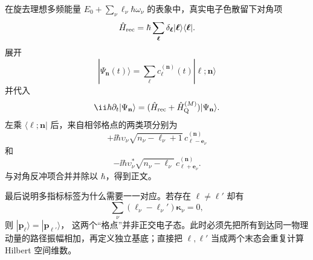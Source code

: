 \begin{derivation}
在旋去理想多频能量
$E_0+\sum_\nu\ell_\nu\hbar\omega_\nu$
的表象中，真实电子色散留下对角项
\[
\hat H_{\rm rec}
=
\hbar\sum_{\boldsymbol\ell}
\delta_{\boldsymbol\ell}
|\boldsymbol\ell\rangle\langle\boldsymbol\ell|.
\]
展开
\[
|\Psi_{\mathbf n}(t)\rangle
=
\sum_{\boldsymbol\ell}
c_{\boldsymbol\ell}^{(\mathbf n)}(t)
|\boldsymbol\ell;\mathbf n\rangle
\]
并代入
\[
\ii\hbar\partial_t|\Psi_{\mathbf n}\rangle
=
(\hat H_{\rm rec}+\hat H_{\rm Q}^{(M)})
|\Psi_{\mathbf n}\rangle.
\]
左乘 $\langle\boldsymbol\ell;\mathbf n|$ 后，来自相邻格点的两类项分别为
\[
+\ii\hbar
\upsilon_\nu
\sqrt{n_\nu-\ell_\nu+1}\,
c_{\boldsymbol\ell-\mathbf e_\nu}^{(\mathbf n)}
\]
和
\[
-\ii\hbar
\upsilon_\nu^*
\sqrt{n_\nu-\ell_\nu}\,
c_{\boldsymbol\ell+\mathbf e_\nu}^{(\mathbf n)}.
\]
与对角反冲项合并并除以 $\hbar$，得到正文。

最后说明多指标标签为什么需要一一对应。若存在
$\boldsymbol\ell\neq\boldsymbol\ell'$ 却有
\[
\sum_\nu
(\ell_\nu-\ell_\nu')
\boldsymbol\kappa_\nu=0,
\]
则
$|\mathbf p_{\boldsymbol\ell}\rangle=
|\mathbf p_{\boldsymbol\ell'}\rangle$，
这两个“格点”并非正交电子态。此时必须先把所有到达同一物理动量的路径振幅相加，再定义独立基底；直接把 $\boldsymbol\ell,\boldsymbol\ell'$ 当成两个末态会重复计算 Hilbert 空间维数。
\end{derivation}

